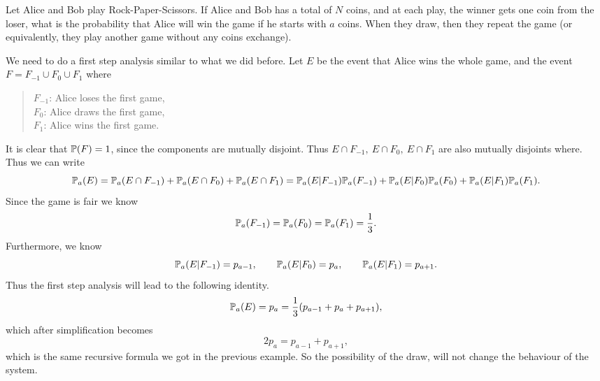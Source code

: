 \begin{problem}
	Let Alice and Bob play Rock-Paper-Scissors. If Alice and Bob has a total of $N$ coins, and at each play, the winner gets one coin from the loser, what is the probability that Alice will win the game if he starts with $a$ coins. When they draw, then they repeat the game (or equivalently, they play another game without any coins exchange).
\end{problem}
\begin{solution}
	We need to do a first step analysis similar to what we did before. Let $E$ be the event that Alice wins the whole game, and the event $F=F_{-1}\cup F_0 \cup F_1$ where
	\begin{quote}
		$F_{-1}$: Alice loses the first game,\\
		$F_0$: Alice draws the first game,\\
		$F_1$: Alice wins the first game.
	\end{quote}
	It is clear that $\mathbb{P}(F) = 1$, since the components are mutually disjoint. Thus $E\cap F_{-1},\ E\cap F_0,\ E\cap F_1$ are also mutually disjoints where. Thus we can write
	\[\mathbb{P}_a(E) = \mathbb{P}_a(E\cap F_{-1}) + \mathbb{P}_a(E\cap F_0) + \mathbb{P}_a(E\cap F_1)
	= \mathbb{P}_a(E|F_{-1})\mathbb{P}_a(F_{-1}) + \mathbb{P}_a(E|F_0)\mathbb{P}_a(F_0) + \mathbb{P}_a(E|F_1)\mathbb{P}_a(F_1).
	\]
	Since the game is fair we know
	\[ \mathbb{P}_a(F_{-1}) = \mathbb{P}_a(F_0) = \mathbb{P}_a(F_1) = \frac{1}{3}.  \]
	Furthermore, we know
	\[ \mathbb{P}_a(E|F_{-1}) = p_{a-1}, \qquad \mathbb{P}_a(E|F_0) = p_a, \qquad \mathbb{P}_a(E|F_1) = p_{a+1}. \]
	Thus the first step analysis will lead to the following identity.
	\[  \mathbb{P}_a(E) = p_a = \frac{1}{3} ( p_{a-1} + p_{a} + p_{a+1}),\]
	which after simplification becomes
	\[ 2p_a = p_{a-1} + p_{a+1}, \]
	which is the same recursive formula we got in the previous example. So the possibility of the draw, will not change the behaviour of the system.
\end{solution}

